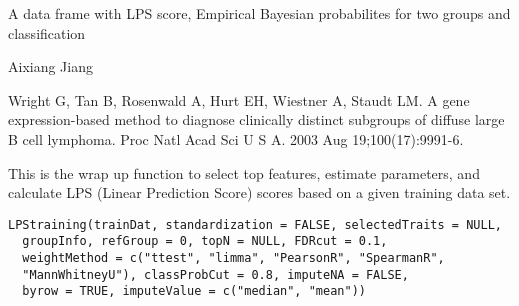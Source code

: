 \documentclass[letterpaper]{book}
\begin{document}
%
\begin{Value}
A data frame with LPS score, Empirical Bayesian probabilites for two groups and classification
\end{Value}
%
\begin{Author}\relax
Aixiang Jiang
\end{Author}
%
\begin{References}\relax
Wright G, Tan B, Rosenwald A, Hurt EH, Wiestner A, Staudt LM. A gene expression-based method
to diagnose clinically distinct subgroups of diffuse large B cell lymphoma. Proc Natl Acad Sci U S
A. 2003 Aug 19;100(17):9991-6.
\end{References}
%
\begin{Description}\relax
This is the wrap up function to select top features, estimate parameters, and calculate LPS (Linear Prediction Score) scores 
based on a given training data set.
\end{Description}
%
\begin{Usage}
\begin{verbatim}
LPStraining(trainDat, standardization = FALSE, selectedTraits = NULL,
  groupInfo, refGroup = 0, topN = NULL, FDRcut = 0.1,
  weightMethod = c("ttest", "limma", "PearsonR", "SpearmanR",
  "MannWhitneyU"), classProbCut = 0.8, imputeNA = FALSE,
  byrow = TRUE, imputeValue = c("median", "mean"))
\end{verbatim}
\end{Usage}
%
\end{document}
